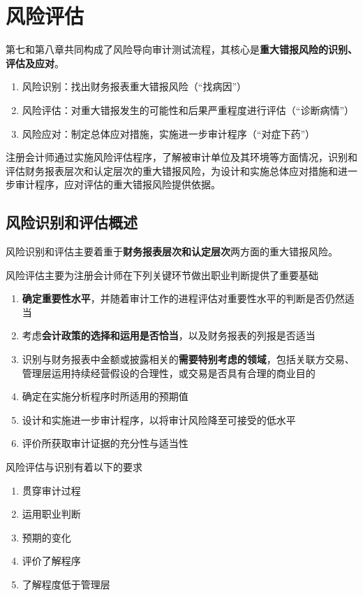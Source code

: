 \documentclass[UTF8,12pt]{ctexart}
\numberwithin{equation}{section} %
\numberwithin{figure}{section}
\numberwithin{table}{section}
\begin{document}
	\newpage
	\section{风险评估}
	第七和第八章共同构成了风险导向审计测试流程，其核心是\textbf{重大错报风险的识别、评估及应对}。
	\begin{enumerate}
		\item 风险识别：找出财务报表重大错报风险（“找病因”）
		
		\item 风险评估：对重大错报发生的可能性和后果严重程度进行评估（“诊断病情”）
		
		\item 风险应对：制定总体应对措施，实施进一步审计程序（“对症下药”）
	\end{enumerate}
	
	注册会计师通过实施风险评估程序，了解被审计单位及其环境等方面情况，识别和评估财务报表层次和认定层次的重大错报风险，为设计和实施总体应对措施和进一步审计程序，应对评估的重大错报风险提供依据。
	
	\subsection{风险识别和评估概述}
	风险识别和评估主要着重于\textbf{财务报表层次和认定层次}两方面的重大错报风险。
	
	风险评估主要为注册会计师在下列关键环节做出职业判断提供了重要基础
	\begin{enumerate}
		\item \textbf{确定重要性水平}，并随着审计工作的进程评估对重要性水平的判断是否仍然适当
		
		\item 考虑\textbf{会计政策的选择和运用是否恰当}，以及财务报表的列报是否适当
		
		\item 识别与财务报表中金额或披露相关的\textbf{需要特别考虑的领域}，包括关联方交易、管理层运用持续经营假设的合理性，或交易是否具有合理的商业目的
		
		\item 确定在实施分析程序时所适用的预期值
		
		\item 设计和实施进一步审计程序，以将审计风险降至可接受的低水平
		
		\item 评价所获取审计证据的充分性与适当性
	\end{enumerate}
	
	风险评估与识别有着以下的要求
	\begin{enumerate}
		\item 贯穿审计过程
		
		\item 运用职业判断
		
		\item 预期的变化
		
		\item 评价了解程序
		
		\item 了解程度低于管理层
	\end{enumerate}
	
\end{document}
